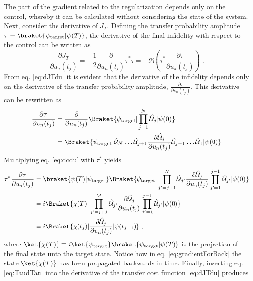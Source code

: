 The part of the gradient related to the regularization depends only on the control, whereby it can be calculated without considering the state of the system.\\ 
Next, consider the derivative of $J_T$. Defining the transfer probability amplitude $\tau \equiv \braket{\psi_{\mathrm{target}} | \psi (T)}$, the derivative of the final infidelity with respect to the control can be written as 
\begin{equation}
	\frac{\partial J_T}{\partial u_n (t_j)} = - \frac{1}{2} \frac{\partial}{\partial u_n (t_j)}  \tau^* \tau   = - \Re \left( \tau^* \frac{\partial \tau}{\partial u_n (t_j)} \right) \; .
	\label{eq:dJTdu}
\end{equation}
From eq. \eqref{eq:dJTdu} it is evident that the derivative of the infidelity depends only on the derivative of the transfer probability amplitude, $\frac{\partial \tau}{\partial u_n (t_j)}$. This derivative can be rewritten as
\begin{align}
	\frac{\partial \tau}{\partial u_n (t_j)} &= \frac{\partial }{\partial u_n (t_j)} \Braket{\psi_{\mathrm{target}} | \prod_{j = 1}^{N} \hat{\mathcal{U}}_j | \psi (0)} \nonumber \\
	&= \Braket{\psi_{\mathrm{target}} | \hat{\mathcal{U}}_N \ldots \hat{\mathcal{U}}_{j+1} \frac{\partial \hat{\mathcal{U}}_{j}}{\partial u_n (t_j)} \hat{\mathcal{U}}_{j-1} \ldots \hat{\mathcal{U}}_{1} | \psi (0)}
	\label{eq:dcdu}
\end{align}
Multiplying eq. \eqref{eq:dcdu} with $\tau^*$ yields
\begin{align}
	\tau^* \frac{\partial \tau}{\partial u_n (t_j)} &=  \braket{\psi(T) | \psi_{\mathrm{target}}} \Braket{\psi_{\mathrm{target}} | \prod_{j' = j +1}^{N} \hat{\mathcal{U}}_{j '} \frac{\partial \hat{\mathcal{U}}_{j}}{\partial u_n (t_j)} \prod_{j' = 1}^{ j-1} \hat{\mathcal{U}}_{j '} | \psi (0)} \\
	&= i \Braket{\chi (T) | \prod_{j' = j +1}^{M} \hat{\mathcal{U}}_{j '} \frac{\partial \hat{\mathcal{U}}_{j}}{\partial u_n (t_j)} \prod_{j' = 1}^{ j-1} \hat{\mathcal{U}}_{j '} | \psi (0)} \\
	&= i \Braket{\chi (t_j) |  \frac{\partial \hat{\mathcal{U}}_{j}}{\partial u_n (t_j)} | \psi (t_{j-1})} \; ,
	\label{eq:TaudTau}
\end{align}
where $\ket{\chi (T)} \equiv i \ket{\psi_{\mathrm{target}}} \braket{\psi_{\mathrm{target}} | \psi (T)}$ is the projection of the final state unto the target state. Notice how in eq. \eqref{eq:gradientForBack} the state $\ket{\chi (T)}$ has been propagated backwards in time. Finally, inserting eq. \eqref{eq:TaudTau} into the derivative of the transfer cost function \eqref{eq:dJTdu} produces
